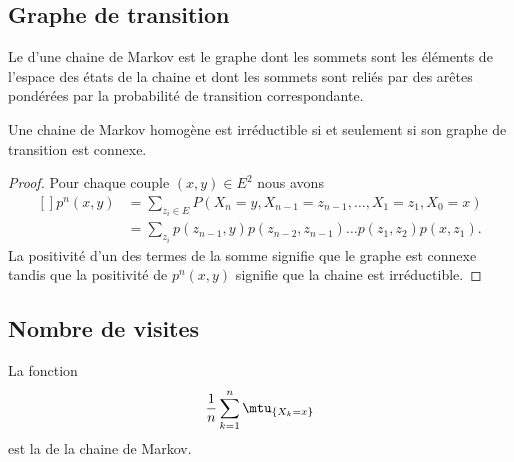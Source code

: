 \subsection{Graphe de transition}

Le  d'une chaine de Markov est le graphe dont les sommets sont les éléments de l'espace des états de la chaine et dont les sommets sont reliés par des arêtes pondérées par la probabilité de transition correspondante.

\begin{lemma}
	Une chaine de Markov homogène est irréductible si et seulement si son graphe de transition est connexe.
\end{lemma}

\begin{proof}
	Pour chaque couple \( (x,y)\in E^2\) nous avons
	\begin{equation}
		\begin{aligned}[]
			p^n(x,y) & =\sum_{z_i\in E}P(X_n=y,X_{n-1}=z_{n-1},\ldots,X_1=z_1,X_0=x)       \\
			         & =\sum_{z_i}p(z_{n-1},y)p(z_{n-2},z_{n-1})\ldots p(z_1,z_2)p(x,z_1).
		\end{aligned}
	\end{equation}
	La positivité d'un des termes de la somme signifie que le graphe est connexe tandis que la positivité de \( p^n(x,y)\) signifie que la chaine est irréductible.
\end{proof}


\subsection{Nombre de visites}

La fonction
\begin{equation}
	\frac{1}{ n }\sum_{k=1}^n\mtu_{\{ X_k=x \}}
\end{equation}
est la  de la chaine de Markov.

